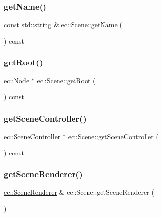 \subsubsection{\texorpdfstring{get\+Name()}{getName()}}
{\footnotesize\ttfamily const std\+::string \& ec\+::\+Scene\+::get\+Name (\begin{DoxyParamCaption}{ }\end{DoxyParamCaption}) const}

\mbox{\label{classec_1_1_scene_aef77276f4a386c5b66159ecb1d4d072c}} 
\subsubsection{\texorpdfstring{get\+Root()}{getRoot()}}
{\footnotesize\ttfamily \mbox{\hyperlink{classec_1_1_node}{ec\+::\+Node}} $\ast$ ec\+::\+Scene\+::get\+Root (\begin{DoxyParamCaption}{ }\end{DoxyParamCaption}) const}

\mbox{\label{classec_1_1_scene_ad562a16db4552e529af7284de0b79304}} 
\subsubsection{\texorpdfstring{get\+Scene\+Controller()}{getSceneController()}}
{\footnotesize\ttfamily \mbox{\hyperlink{classec_1_1_scene_controller}{ec\+::\+Scene\+Controller}} $\ast$ ec\+::\+Scene\+::get\+Scene\+Controller (\begin{DoxyParamCaption}{ }\end{DoxyParamCaption}) const}

\mbox{\label{classec_1_1_scene_a73f48395e9442f3e6647dd9503050b91}} 
\subsubsection{\texorpdfstring{get\+Scene\+Renderer()}{getSceneRenderer()}}
{\footnotesize\ttfamily \mbox{\hyperlink{classec_1_1_scene_renderer}{ec\+::\+Scene\+Renderer}} \& ec\+::\+Scene\+::get\+Scene\+Renderer (\begin{DoxyParamCaption}{ }\end{DoxyParamCaption})}

